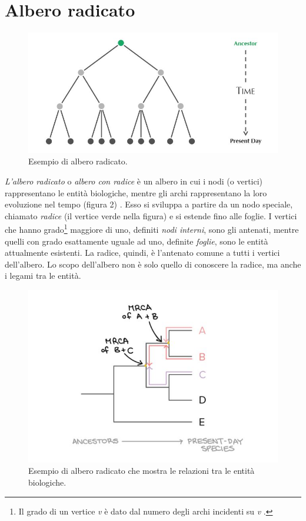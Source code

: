 \section{Albero radicato}
\begin{figure}[h!]
	\includegraphics[width=\linewidth]{rooted_tree.jpg}
 	\caption{Esempio di albero radicato.}
  	\label{fig:RootedTree}
\end{figure}
\textit{L'albero radicato} o \textit{albero con radice} è un albero in cui i nodi (o vertici) rappresentano le entità biologiche, mentre gli archi rappresentano la loro evoluzione nel tempo (figura 2) \cite{bioinfalganactivelearningapproachparttwo}. Esso si sviluppa a partire da un nodo speciale, chiamato \textit{radice} (il vertice verde nella figura) e si estende fino alle foglie. I vertici che hanno grado\footnote{Il grado di un vertice \textit{v} è dato dal numero degli archi incidenti su \textit{v} \cite{algoritmiEStruttureDati2}.} maggiore di uno, definiti \textit{nodi interni}, sono gli antenati, mentre quelli con grado esattamente uguale ad uno, definite \textit{foglie}, sono le entità attualmente esistenti. La radice, quindi, è l'antenato comune a tutti i vertici dell'albero.
\newline
Lo scopo dell'albero non è solo quello di conoscere la radice, ma anche i legami tra le entità.
\newline
\begin{figure}[h!]
	\includegraphics[width=\linewidth]{rooted_tree_2.jpg}
 	\caption{Esempio di albero radicato che mostra le relazioni tra le entità biologiche.}
  	\label{fig:RootedTree}
\end{figure}
